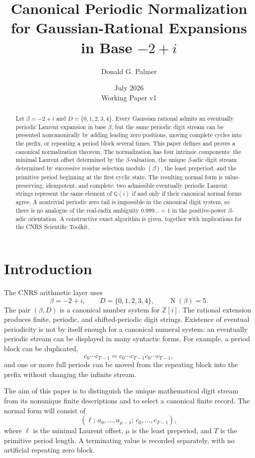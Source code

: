 \documentclass[11pt]{article}
\title{Canonical Periodic Normalization for Gaussian-Rational Expansions\\
in Base $-2+i$}
\author{Donald G. Palmer}
\date{July 2026\\Working Paper v1}
\theoremstyle{definition}
\newcommand{\Zi}{\mathbb{Z}[i]}
\newcommand{\Norm}{\operatorname{N}}
\begin{document}
\maketitle

\begin{abstract}
Let $\beta=-2+i$ and $D=\{0,1,2,3,4\}$.  Every Gaussian rational admits an eventually periodic Laurent expansion in base $\beta$, but the same periodic digit stream can be presented noncanonically by adding leading zero positions, moving complete cycles into the prefix, or repeating a period block several times.  This paper defines and proves a canonical normalization theorem.  The normalization has four intrinsic components: the minimal Laurent offset determined by the $\beta$-valuation, the unique $\beta$-adic digit stream determined by successive residue selection modulo $(\beta)$, the least preperiod, and the primitive period beginning at the first cyclic state.  The resulting normal form is value-preserving, idempotent, and complete: two admissible eventually periodic Laurent strings represent the same element of $\mathbb Q(i)$ if and only if their canonical normal forms agree.  A nontrivial periodic zero tail is impossible in the canonical digit system, so there is no analogue of the real-radix ambiguity $0.999\ldots=1$ in the positive-power $\beta$-adic orientation.  A constructive exact algorithm is given, together with implications for the CNRS Scientific Toolkit.
\end{abstract}

\section{Introduction}

The CNRS arithmetic layer uses
\[
\beta=-2+i,
\qquad
D=\{0,1,2,3,4\},
\qquad
\Norm(\beta)=5.
\]
The pair $(\beta,D)$ is a canonical number system for $\Zi$.  The rational extension produces finite, periodic, and shifted-periodic digit strings.  Existence of eventual periodicity is not by itself enough for a canonical numeral system: an eventually periodic stream can be displayed in many syntactic forms.  For example, a period block can be duplicated,
\[
\overline{c_0\cdots c_{T-1}}
=
\overline{c_0\cdots c_{T-1}c_0\cdots c_{T-1}},
\]
and one or more full periods can be moved from the repeating block into the prefix without changing the infinite stream.

The aim of this paper is to distinguish the unique mathematical digit stream from its nonunique finite descriptions and to select a canonical finite record.  The normal form will consist of
\[
(\ell;\,a_0,\ldots,a_{\mu-1};\,c_0,\ldots,c_{T-1}),
\]
where $\ell$ is the minimal Laurent offset, $\mu$ is the least preperiod, and $T$ is the primitive period length.  A terminating value is recorded separately, with no artificial repeating zero block.
\end{document}
